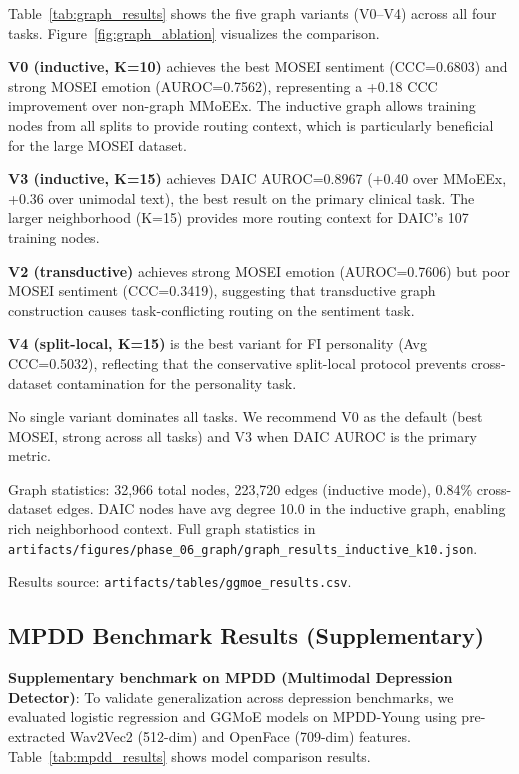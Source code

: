 \documentclass[12pt,oneside]{book}
\begin{document}
\begin{itemize}
Table~\ref{tab:graph_results} shows the five graph variants (V0--V4) across all four tasks. Figure~\ref{fig:graph_ablation} visualizes the comparison.

\textbf{V0 (inductive, K=10)} achieves the best MOSEI sentiment (CCC=0.6803) and strong MOSEI emotion (AUROC=0.7562), representing a +0.18 CCC improvement over non-graph MMoEEx. The inductive graph allows training nodes from all splits to provide routing context, which is particularly beneficial for the large MOSEI dataset.

\textbf{V3 (inductive, K=15)} achieves DAIC AUROC=0.8967 (+0.40 over MMoEEx, +0.36 over unimodal text), the best result on the primary clinical task. The larger neighborhood (K=15) provides more routing context for DAIC's 107 training nodes.

\textbf{V2 (transductive)} achieves strong MOSEI emotion (AUROC=0.7606) but poor MOSEI sentiment (CCC=0.3419), suggesting that transductive graph construction causes task-conflicting routing on the sentiment task.

\textbf{V4 (split-local, K=15)} is the best variant for FI personality (Avg CCC=0.5032), reflecting that the conservative split-local protocol prevents cross-dataset contamination for the personality task.

No single variant dominates all tasks. We recommend V0 as the default (best MOSEI, strong across all tasks) and V3 when DAIC AUROC is the primary metric.

Graph statistics: 32,966 total nodes, 223,720 edges (inductive mode), 0.84\% cross-dataset edges. DAIC nodes have avg degree 10.0 in the inductive graph, enabling rich neighborhood context. Full graph statistics in \texttt{artifacts/figures/phase\_06\_graph/graph\_results\_inductive\_k10.json}.

Results source: \texttt{artifacts/tables/ggmoe\_results.csv}.

\subsection{MPDD Benchmark Results (Supplementary)}
\label{sec:mpdd_benchmark}

\textbf{Supplementary benchmark on MPDD (Multimodal Depression Detector)}: To validate generalization across depression benchmarks, we evaluated logistic regression and GGMoE models on MPDD-Young using pre-extracted Wav2Vec2 (512-dim) and OpenFace (709-dim) features. Table~\ref{tab:mpdd_results} shows model comparison results.


\end{itemize}
\end{document}
